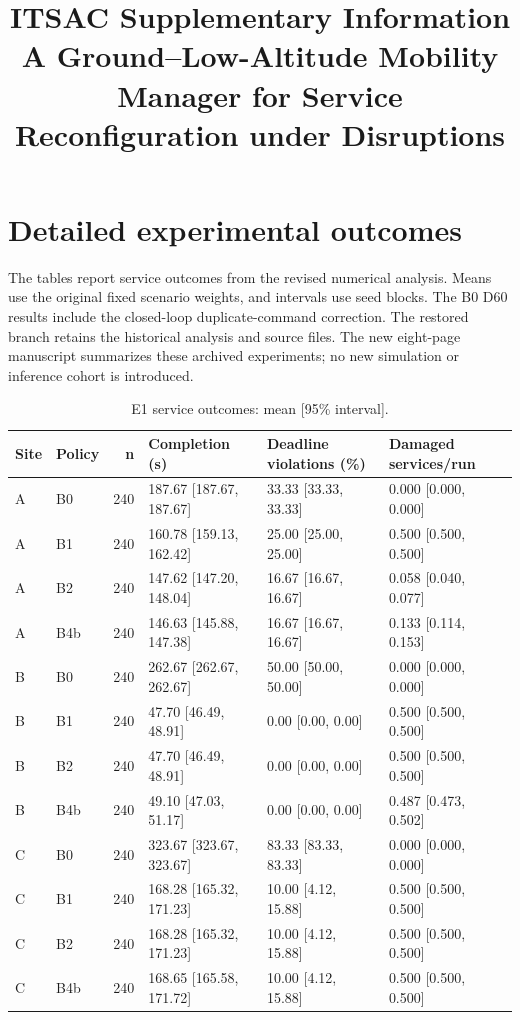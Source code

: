 \documentclass[11pt,a4paper]{article}
\title{ITSAC Supplementary Information\\[8pt]\large A Ground--Low-Altitude Mobility Manager for Service Reconfiguration under Disruptions}
\author{}
\date{}
\begin{document}
\maketitle
\section{Detailed experimental outcomes}

The tables report service outcomes from the revised numerical analysis. Means use the original fixed scenario weights, and intervals use seed blocks. The B0 D60 results include the closed-loop duplicate-command correction. The restored branch retains the historical analysis and source files. The new eight-page manuscript summarizes these archived experiments; no new simulation or inference cohort is introduced.

\begin{table}[H]
\centering
\small
\setlength{\tabcolsep}{3pt}
\caption{E1 service outcomes: mean [95\% interval].}
\label{tab:S1}
\begin{tabularx}{\textwidth}{@{}llrYYY@{}}
\toprule
Site & Policy & n & Completion (s) & Deadline violations (\%) & Damaged services/run \\
\midrule
A & B0 & 240 & 187.67 [187.67, 187.67] & 33.33 [33.33, 33.33] & 0.000 [0.000, 0.000] \\
A & B1 & 240 & 160.78 [159.13, 162.42] & 25.00 [25.00, 25.00] & 0.500 [0.500, 0.500] \\
A & B2 & 240 & 147.62 [147.20, 148.04] & 16.67 [16.67, 16.67] & 0.058 [0.040, 0.077] \\
A & B4b & 240 & 146.63 [145.88, 147.38] & 16.67 [16.67, 16.67] & 0.133 [0.114, 0.153] \\
B & B0 & 240 & 262.67 [262.67, 262.67] & 50.00 [50.00, 50.00] & 0.000 [0.000, 0.000] \\
B & B1 & 240 & 47.70 [46.49, 48.91] & 0.00 [0.00, 0.00] & 0.500 [0.500, 0.500] \\
B & B2 & 240 & 47.70 [46.49, 48.91] & 0.00 [0.00, 0.00] & 0.500 [0.500, 0.500] \\
B & B4b & 240 & 49.10 [47.03, 51.17] & 0.00 [0.00, 0.00] & 0.487 [0.473, 0.502] \\
C & B0 & 240 & 323.67 [323.67, 323.67] & 83.33 [83.33, 83.33] & 0.000 [0.000, 0.000] \\
C & B1 & 240 & 168.28 [165.32, 171.23] & 10.00 [4.12, 15.88] & 0.500 [0.500, 0.500] \\
C & B2 & 240 & 168.28 [165.32, 171.23] & 10.00 [4.12, 15.88] & 0.500 [0.500, 0.500] \\
C & B4b & 240 & 168.65 [165.58, 171.72] & 10.00 [4.12, 15.88] & 0.500 [0.500, 0.500] \\
\bottomrule
\end{tabularx}
\end{table}
\end{document}
